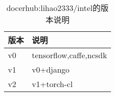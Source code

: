 \begin{table}[H]
\centering
\begin{tabular}{ll}
\toprule
  版本&说明\\
\midrule
  v0&tensorflow,caffe,ncsdk\\
  v1&v0+django\\
  v2&v1+torch-cl\\
\bottomrule
\end{tabular}
\caption{docerhub:lihao2333/intel的版本说明}
  \label{tbl:docker-version}
\end{table}
